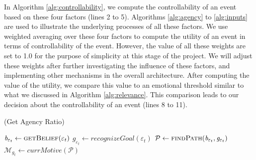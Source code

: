 \documentclass{aamas2016}
\begin{document}
In Algorithm \ref{alg:controllability}, we compute the controllability of an
event based on these four factors (lines 2 to 5). Algorithms \ref{alg:agency} to
\ref{alg:inputs} are used to illustrate the underlying processes of all these
factors. We use weighted averaging over these four factors to compute the
utility of an event in terms of controllability of the event. However, the
value of all these weights are set to 1.0 for the purpose of simplicity at
this stage of the project. We will adjust these weights after further
investigating the influence of these factors, and implementing other mechanisms
in the overall architecture. After computing the value of the utility, we
compare this value to an emotional threshold similar to what we discussed in
Algorithm \ref{alg:relevance}. This comparison leads to our decision about the
controllability of an event (lines 8 to 11).

\renewcommand\thealgorithm{4\alph{algorithm}}
\setcounter{algorithm}{0}

\begin{algorithm}
	\caption{(Get Agency Ratio)}
	\label{alg:agency}
	\begin{algorithmic}[1]
			\Statex
			\State $\mathit{b}_{\varepsilon_t} \gets \Call{getBelief}{\varepsilon_t}$
			\State $\mathit{g}_{\varepsilon_t} \gets
			\textit{recognizeGoal}{(\varepsilon_t)}$
			\Statex
				\State {}
			\EndIf
			\Statex
			\State $\mathcal{P} \gets \Call{findPath}{\mathit{b}_{\varepsilon_t},
			\mathit{g}_{\varepsilon_t}}$
			\Statex
				\State
				\State $\mathcal{M}_{\mathit{g}_{t}} \gets
				\textit{currMotive}{(\mathcal{P})}$
				\Statex
					 \State {}
					\Else
						\State {}
					\EndIf
				\Else
					\State {}
				\EndIf
			\Else
				\State {}
			\EndIf
		\EndFunction 
	\end{algorithmic}
\end{algorithm}
\end{document}
